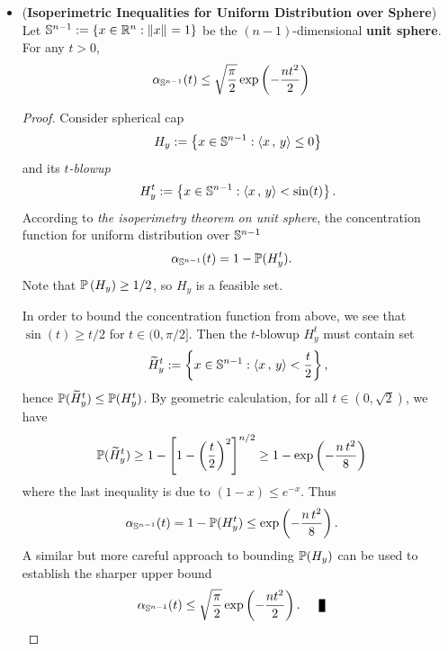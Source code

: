 \documentclass[11pt]{article}
\begin{document}
\begin{itemize}
\item \begin{proposition} (\textbf{Isoperimetric Inequalities for Uniform Distribution over Sphere})  \citep{boucheron2013concentration, vershynin2018high, wainwright2019high}\\
Let ${\mathbb S}^{n - 1} :=  \left\{x \in {\mathbb R}^n: \left\|x\right\|_{} = 1\right\}$ be the $(n-1)$-dimensional \textbf{unit sphere}.  For any $t >0$, 
\begin{align}
\alpha_{{\mathbb S}^{n-1}}(t) &\le \sqrt{\frac{\pi}{2}}\exp\left(-\frac{n t^2}{2}\right) \label{ineqn: isoperimetric_inequality_uniform_unit_sphere}
\end{align}
\end{proposition}
\begin{proof}
Consider spherical cap 
\begin{align*}
H_y := \left\{x \in {\mathbb S}^{n-1}: \left\langle x\,,\, y \right\rangle \le 0\right\}
\end{align*} and its  \emph{$t$-blowup}
\begin{align*}
H_y^{t} := \left\{x \in {\mathbb S}^{n-1}: \left\langle x\,,\, y \right\rangle < \sin(t)\right\}.
\end{align*} According to \emph{the isoperimetry theorem on unit sphere}, the concentration function for uniform distribution over ${\mathbb S}^{n-1}$
\begin{align*}
\alpha_{{\mathbb S}^{n-1}}(t) &= 1 - {\mathbb P}(H_y^{t}).
\end{align*} Note that ${\mathbb P}\left(H_y\right) \ge 1/2$, so $H_y$ is a feasible set. 

In order to bound the concentration function from above, we see that $\sin(t) \ge t/2$ for $t \in (0, \pi/2]$. Then the $t$-blowup $H_y^{t}$ must contain set
\begin{align*}
\widetilde{H}_y^{t} := \left\{x \in {\mathbb S}^{n-1}: \left\langle x\,,\, y \right\rangle < \frac{t}{2}\right\},
\end{align*} hence ${\mathbb P}(\widetilde{H}_y^{t}) \le {\mathbb P}(H_y^{t} )$. By geometric calculation, for all $t\in (0, \sqrt{2})$, we have 
\begin{align*}
{\mathbb P}(\widetilde{H}_y^{t}) &\ge 1- \left[1 - \left(\frac{t}{2}\right)^2\right]^{n/2} \ge 1 - \exp\left(-\frac{n\,t^2}{8}\right)
\end{align*} where the last inequality is due to $(1 - x) \le e^{-x}$. Thus
\begin{align*}
\alpha_{{\mathbb S}^{n-1}}(t) &= 1 - {\mathbb P}(H_y^{t}) \le \exp\left(-\frac{n\,t^2}{8}\right).
\end{align*} A similar but more careful approach to bounding ${\mathbb P}(H_y)$ can be used to establish the sharper upper bound
\begin{align*}
\alpha_{\bS^{n-1}}(t) &\le  \sqrt{\frac{\pi}{2}}\exp\paren{-\frac{n t^2}{2}}. \qed
\end{align*}
\end{proof}


\end{itemize}
\end{document}
